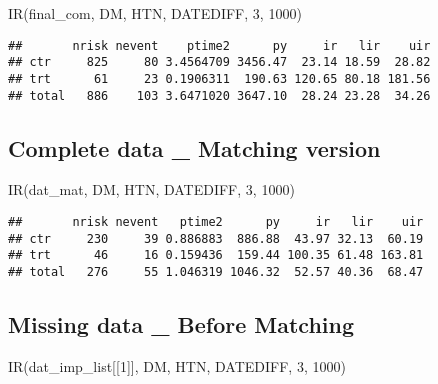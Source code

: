 \documentclass[
]{book}
\newenvironment{Shaded}{\begin{snugshade}}{\end{snugshade}}
\newcommand{\DecValTok}[1]{\textcolor[rgb]{0.00,0.00,0.81}{#1}}
\newcommand{\FunctionTok}[1]{\textcolor[rgb]{0.00,0.00,0.00}{#1}}
\newcommand{\NormalTok}[1]{#1}
\begin{document}
\begin{Shaded}
\begin{Highlighting}[]
\FunctionTok{IR}\NormalTok{(final\_com, DM, HTN, DATEDIFF, }\DecValTok{3}\NormalTok{, }\DecValTok{1000}\NormalTok{)}
\end{Highlighting}
\end{Shaded}

\begin{verbatim}
##       nrisk nevent    ptime2      py     ir   lir    uir
## ctr     825     80 3.4564709 3456.47  23.14 18.59  28.82
## trt      61     23 0.1906311  190.63 120.65 80.18 181.56
## total   886    103 3.6471020 3647.10  28.24 23.28  34.26
\end{verbatim}

\hypertarget{complete-data-_-matching-version}{%
\subsection{Complete data \_ Matching version}\label{complete-data-_-matching-version}}

\begin{Shaded}
\begin{Highlighting}[]
\FunctionTok{IR}\NormalTok{(dat\_mat, DM, HTN, DATEDIFF, }\DecValTok{3}\NormalTok{, }\DecValTok{1000}\NormalTok{)}
\end{Highlighting}
\end{Shaded}

\begin{verbatim}
##       nrisk nevent   ptime2      py     ir   lir    uir
## ctr     230     39 0.886883  886.88  43.97 32.13  60.19
## trt      46     16 0.159436  159.44 100.35 61.48 163.81
## total   276     55 1.046319 1046.32  52.57 40.36  68.47
\end{verbatim}

\hypertarget{missing-data-_-before-matching}{%
\subsection{Missing data \_ Before Matching}\label{missing-data-_-before-matching}}

\begin{Shaded}
\begin{Highlighting}[]
\FunctionTok{IR}\NormalTok{(dat\_imp\_list[[}\DecValTok{1}\NormalTok{]], DM, HTN, DATEDIFF, }\DecValTok{3}\NormalTok{, }\DecValTok{1000}\NormalTok{)}
\end{Highlighting}
\end{Shaded}
\end{document}
